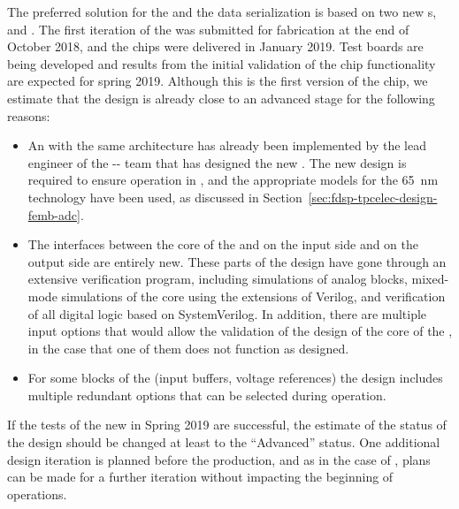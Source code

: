 The preferred solution for the  and the data serialization is based on two new 
s,  and .
The first iteration of the  was submitted for fabrication
at the end of October 2018, and the chips were delivered in January 2019.
Test boards are being developed and results from the initial validation of the
chip functionality are expected for spring 2019. Although %
this is the first version
of the chip, we estimate that the design is already close to an advanced stage
for the following reasons:
\begin{itemize}
\item{An  with the same architecture has already been implemented by the
lead engineer of the -- team that has designed the new .
The new design is required to ensure operation in \lar, and the appropriate
models for the \SI{65}{nm} technology have been used, as discussed in
Section~\ref{sec:fdsp-tpcelec-design-femb-adc}.}
\item{The interfaces between the core of the  and  on 
the input side and  on the output side are entirely new.
These parts of the design have gone through an extensive verification
program, including  simulations of analog blocks,
mixed-mode simulations of the core  using the 
extensions of Verilog, and  verification of 
all digital logic based on SystemVerilog. In addition, there are multiple 
input options that would allow the validation of the design of the core 
of the , in the case that one of them does not function as designed.}
\item{For some blocks of the  (input buffers, voltage references) the
design includes multiple redundant options that can be selected during 
operation.}
\end{itemize}
If the tests of the new  in Spring 2019 are successful, the
estimate of the status of the design should be changed at least to the 
``Advanced'' status. One additional design iteration is planned before
the production, and as in the case of , plans can be made for a
further iteration without impacting the beginning of  operations.

